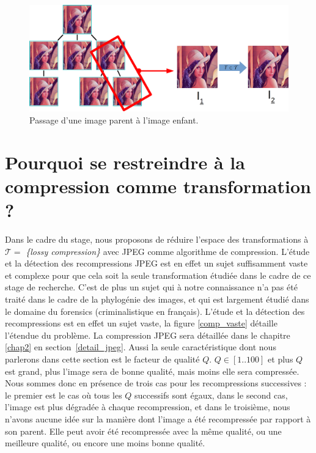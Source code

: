 \documentclass[utf8,final]{stageM2R} %
\begin{document}
\begin{figure}
  \begin{center}
    \includegraphics[width=120mm]{images/tree_extract}
    \caption{Passage d'une image parent à l'image enfant.}
    \label{fig:tree-extract}
  \end{center}
\end{figure}

\section{Pourquoi se restreindre à la compression comme transformation ?}
Dans le cadre du stage, nous proposons de réduire l'espace des transformations à $\mathcal{T} =$ \textit{\{lossy compression\}} avec JPEG comme algorithme de compression. L'étude et la détection des recompressions JPEG est en effet un sujet suffisamment vaste et complexe pour que cela soit la seule transformation étudiée dans le cadre de ce stage de recherche. C'est de plus un sujet qui à notre connaissance n'a pas été traité dans le cadre de la phylogénie des images, et qui est largement étudié dans le domaine du forensics (criminalistique en français). L'étude et la détection des recompressions est en effet un sujet vaste, la figure \ref{comp_vaste} détaille l'étendue du problème. La compression JPEG sera détaillée dans le chapitre \ref{chap2} en section~\ref{detail_jpeg}. Aussi la seule caractéristique dont nous parlerons dans cette section est le facteur de qualité $Q$. $Q \in [1..100]$ et plus $Q$ est grand, plus l'image sera de bonne qualité, mais moins elle sera compressée. Nous sommes donc en présence de trois cas pour les recompressions successives : le premier est le cas où tous les $Q$ successifs sont égaux, dans le second cas, l'image est plus dégradée à chaque recompression, et dans le troisième, nous n'avons aucune idée sur la manière dont l'image a été recompressée par rapport à son parent. Elle peut avoir été recompressée avec la même qualité, ou une meilleure qualité, ou encore une moins bonne qualité.
\end{document}
